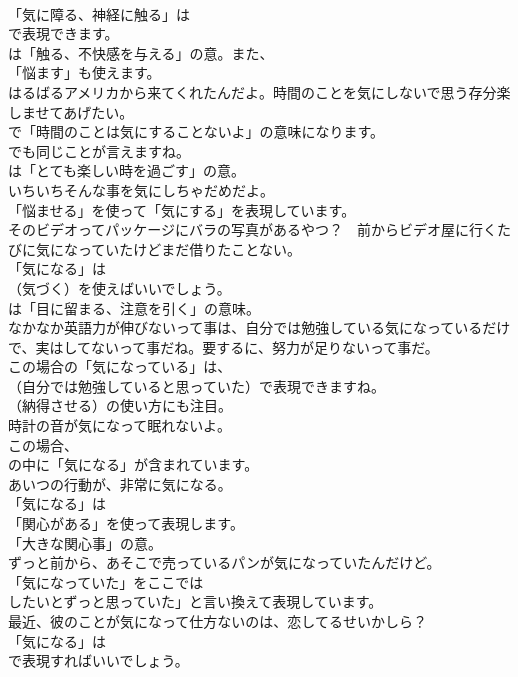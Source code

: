 \documentclass[8pt]{extreport}
\begin{document}
\begin{CJK}{UTF8}{min}
\\	「気に障る、神経に触る」は
\\	で表現できます。
\\	は「触る、不快感を与える」の意。また、
\\	「悩ます」も使えます。	
\\	はるばるアメリカから来てくれたんだよ。時間のことを気にしないで思う存分楽しませてあげたい。 
\\	で「時間のことは気にすることないよ」の意味になります。
\\	でも同じことが言えますね。
\\	は「とても楽しい時を過ごす」の意。	
\\	いちいちそんな事を気にしちゃだめだよ。 
\\	「悩ませる」を使って「気にする」を表現しています。	
\\	そのビデオってパッケージにバラの写真があるやつ？　前からビデオ屋に行くたびに気になっていたけどまだ借りたことない。 
\\	「気になる」は 
\\	（気づく）を使えばいいでしょう。
\\	は「目に留まる、注意を引く」の意味。	
\\	なかなか英語力が伸びないって事は、自分では勉強している気になっているだけで、実はしてないって事だね。要するに、努力が足りないって事だ。 
\\	この場合の「気になっている」は、
\\	（自分では勉強していると思っていた）で表現できますね。
\\	（納得させる）の使い方にも注目。	
\\	時計の音が気になって眠れないよ。 
\\	この場合、
\\	の中に「気になる」が含まれています。	
\\	あいつの行動が、非常に気になる。 
\\	「気になる」は
\\	「関心がある」を使って表現します。
\\	「大きな関心事」の意。	
\\	ずっと前から、あそこで売っているパンが気になっていたんだけど。 
\\	「気になっていた」をここでは
\\	したいとずっと思っていた」と言い換えて表現しています。	
\\	最近、彼のことが気になって仕方ないのは、恋してるせいかしら？ 
\\	「気になる」は 
\\	で表現すればいいでしょう。

\end{CJK}
\end{document}
